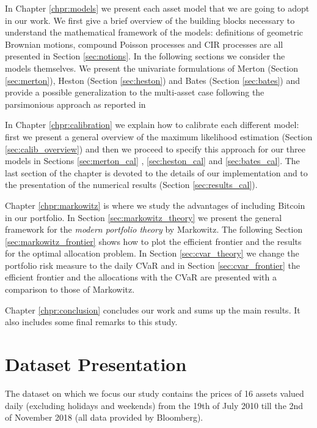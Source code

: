 \bigskip
\noindent
In Chapter \ref{chpr:models} we present each asset model that we are going to adopt in our work. We first give a brief overview of the building blocks necessary to understand the mathematical framework of the models: definitions of geometric Brownian motions, compound Poisson processes and CIR processes are all presented in Section \ref{sec:notions}. 
In the following sections we consider the models themselves. We  present the univariate formulations of Merton (Section \ref{sec:merton}), Heston (Section \ref{sec:heston}) and Bates (Section \ref{sec:bates}) and provide a possible generalization to the multi-asset case following the parsimonious approach as reported in \citep{PARSIMONIOUS2011}

\bigskip
\noindent
In Chapter \ref{chpr:calibration} we explain how to calibrate each different model: first we present a general overview of the maximum likelihood estimation (Section \ref{sec:calib_overview}) and then we proceed to specify this approach for our three models in Sections \ref{sec:merton_cal} , \ref{sec:heston_cal} and \ref{sec:bates_cal}. 
The last section of the chapter is devoted to the details of our implementation and to the presentation of the numerical results (Section \ref{sec:results_cal}).

\bigskip
\noindent
Chapter \ref{chpr:markowitz} is where we study the advantages of including Bitcoin in our portfolio. In Section \ref{sec:markowitz_theory} we present the general framework for the \textit{modern portfolio theory} by Markowitz. The following Section \ref{sec:markowitz_frontier} shows how to plot the efficient frontier and the results for the optimal allocation problem.
In Section \ref{sec:cvar_theory} we change the portfolio risk measure to the daily CVaR and in Section \ref{sec:cvar_frontier} the efficient frontier and the allocations with the CVaR are presented with a comparison to those of Markowitz.

\bigskip
\noindent
Chapter \ref{chpr:conclusion} concludes our work and sums up the main results. It also includes some final remarks to this study.

\bigskip

\section{Dataset  Presentation}
\bigskip
The dataset on which we focus our study contains the prices of 16 assets valued daily (excluding holidays and weekends) from the 19th of July 2010 till the 2nd of November 2018 (all data provided by Bloomberg).

